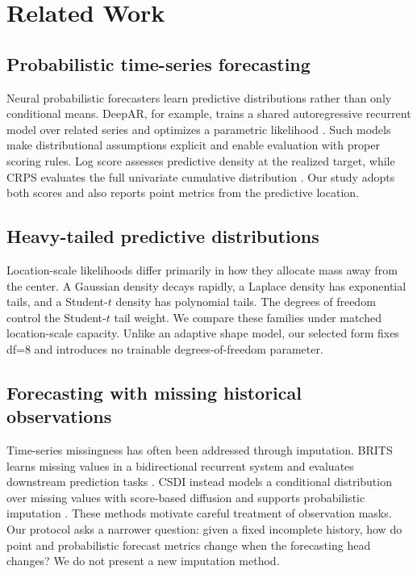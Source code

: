\section{Related Work}
\label{sec:related}

\subsection{Probabilistic time-series forecasting}

Neural probabilistic forecasters learn predictive distributions rather than only conditional means. DeepAR, for example, trains a shared autoregressive recurrent model over related series and optimizes a parametric likelihood \cite{salinas2020deepar}. Such models make distributional assumptions explicit and enable evaluation with proper scoring rules. Log score assesses predictive density at the realized target, while CRPS evaluates the full univariate cumulative distribution \cite{gneiting2007proper}. Our study adopts both scores and also reports point metrics from the predictive location.

\subsection{Heavy-tailed predictive distributions}

Location-scale likelihoods differ primarily in how they allocate mass away from the center. A Gaussian density decays rapidly, a Laplace density has exponential tails, and a Student-$t$ density has polynomial tails. The degrees of freedom control the Student-$t$ tail weight. We compare these families under matched location-scale capacity. Unlike an adaptive shape model, our selected form fixes df=8 and introduces no trainable degrees-of-freedom parameter.

\subsection{Forecasting with missing historical observations}

Time-series missingness has often been addressed through imputation. BRITS learns missing values in a bidirectional recurrent system and evaluates downstream prediction tasks \cite{cao2018brits}. CSDI instead models a conditional distribution over missing values with score-based diffusion and supports probabilistic imputation \cite{tashiro2021csdi}. These methods motivate careful treatment of observation masks. Our protocol asks a narrower question: given a fixed incomplete history, how do point and probabilistic forecast metrics change when the forecasting head changes? We do not present a new imputation method.

